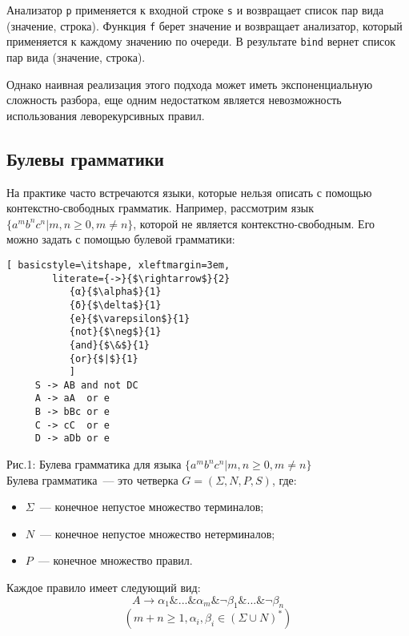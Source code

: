 Анализатор \lstinline[language=Haskell]{p} применяется к входной строке \lstinline[language=Haskell]{s} и возвращает список пар вида (значение, строка). Функция \lstinline[language=Haskell]{f} берет значение и возвращает анализатор, который применяется к каждому значению по очереди. В результате \lstinline[language=Haskell]{bind} вернет список пар вида (значение, строка).
   
Однако наивная реализация этого подхода может иметь экспоненциальную сложность разбора, еще одним недостатком является невозможность использования леворекурсивных правил. %
   
    \subsection{Булевы грамматики}
    
На практике часто встречаются языки,  которые нельзя описать с помощью контекстно-свободных грамматик.
Например, рассмотрим язык $\{a^{m}b^{n}c^{n} |m, n \geq 0, m \neq n\}$, которой не является контекстно-свободным. Его можно задать с помощью булевой грамматики:

\begin{lstlisting}[ basicstyle=\itshape, xleftmargin=3em,
        literate={->}{$\rightarrow$}{2}
           {α}{$\alpha$}{1}
           {δ}{$\delta$}{1}
           {e}{$\varepsilon$}{1}
           {not}{$\neg$}{1}
           {and}{$\&$}{1}
           {or}{$|$}{1}
           ]
     S -> AB and not DC 
     A -> aA  or e
     B -> bBc or e  
     C -> cC  or e  
     D -> aDb or e 
\end{lstlisting}
 Рис.1: Булева грамматика для языка $\{a^{m}b^{n}c^{n} |m, n \geq 0, m \neq n\}$ \\
 
Булева грамматика~--- это четверка $G = (\Sigma, N, P, S)$, где:
    \begin{itemize}
        \item $\Sigma$~--- конечное непустое множество терминалов;
        \item $N$~--- конечное непустое множество нетерминалов;
        \item $P$~--- конечное множество правил.
    \end{itemize}

Каждое правило имеет следующий вид:
    \[A \rightarrow \alpha_1 \&...\&\alpha_m\&\neg \beta_1 \&...\&\neg \beta_n \]
    \[(m + n \geq 1, \alpha_i, \beta_i \in (\Sigma \cup N)^{*}) \]
    
